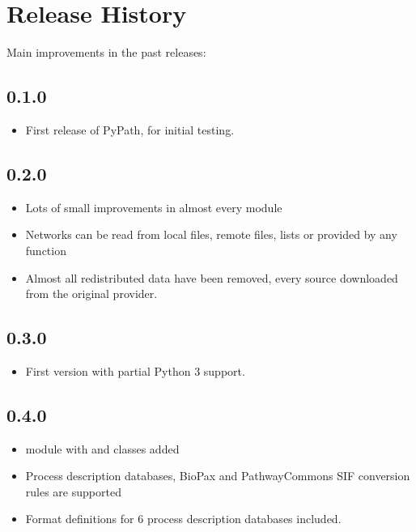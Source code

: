 \documentclass[letterpaper,10pt,english]{sphinxmanual}
\begin{document}
\chapter{Release History}
\label{\detokenize{index:release-history}}
Main improvements in the past releases:


\section{0.1.0}
\label{\detokenize{index:id3}}\begin{itemize}
\item {} 
First release of PyPath, for initial testing.

\end{itemize}


\section{0.2.0}
\label{\detokenize{index:id4}}\begin{itemize}
\item {} 
Lots of small improvements in almost every module

\item {} 
Networks can be read from local files, remote files, lists or provided by any function

\item {} 
Almost all redistributed data have been removed, every source downloaded from the original provider.

\end{itemize}


\section{0.3.0}
\label{\detokenize{index:id5}}\begin{itemize}
\item {} 
First version with partial Python 3 support.

\end{itemize}


\section{0.4.0}
\label{\detokenize{index:id6}}\begin{itemize}
\item {} 
 module with  and  classes added

\item {} 
Process description databases, BioPax and PathwayCommons SIF conversion rules are supported

\item {} 
Format definitions for 6 process description databases included.

\end{itemize}
\end{document}
